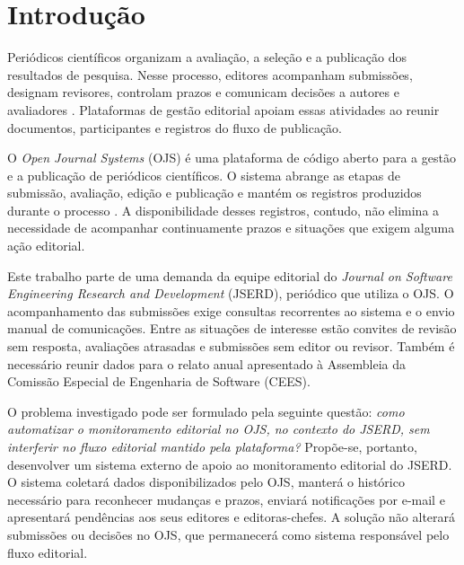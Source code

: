 \chapter{Introdução}
\label{sec-intro}

Periódicos científicos organizam a avaliação, a seleção e a publicação dos resultados de pesquisa. Nesse processo, editores acompanham submissões, designam revisores, controlam prazos e comunicam decisões a autores e avaliadores \cite{meadows1999comunicacao,mueller2000periodico}. Plataformas de gestão editorial apoiam essas atividades ao reunir documentos, participantes e registros do fluxo de publicação.

O \textit{Open Journal Systems} (OJS) é uma plataforma de código aberto para a gestão e a publicação de periódicos científicos. O sistema abrange as etapas de submissão, avaliação, edição e publicação e mantém os registros produzidos durante o processo \cite{willinsky2005ojs,pkp2022learning}. A disponibilidade desses registros, contudo, não elimina a necessidade de acompanhar continuamente prazos e situações que exigem alguma ação editorial.

Este trabalho parte de uma demanda da equipe editorial do \textit{Journal on Software Engineering Research and Development} (JSERD), periódico que utiliza o OJS. O acompanhamento das submissões exige consultas recorrentes ao sistema e o envio manual de comunicações. Entre as situações de interesse estão convites de revisão sem resposta, avaliações atrasadas e submissões sem editor ou revisor. Também é necessário reunir dados para o relato anual apresentado à Assembleia da Comissão Especial de Engenharia de Software (CEES).

O problema investigado pode ser formulado pela seguinte questão: \emph{como automatizar o monitoramento editorial no OJS, no contexto do JSERD, sem interferir no fluxo editorial mantido pela plataforma?} Propõe-se, portanto, desenvolver um sistema externo de apoio ao monitoramento editorial do JSERD. O sistema coletará dados disponibilizados pelo OJS, manterá o histórico necessário para reconhecer mudanças e prazos, enviará notificações por e-mail e apresentará pendências aos seus editores e editoras-chefes. A solução não alterará submissões ou decisões no OJS, que permanecerá como sistema responsável pelo fluxo editorial.

